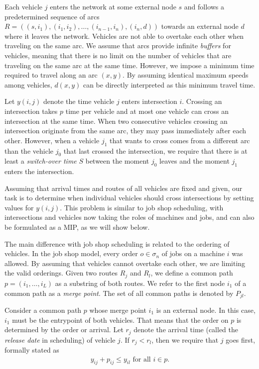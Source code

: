 \documentclass{article}
\theoremstyle{definition}
\theoremstyle{plain}
\begin{document}
Each vehicle $j$ enters the network at some external node $s$ and follows a
predetermined sequence of arcs
$R = ((s,i_{1}), (i_{1},i_{2}), \dots, (i_{n-1},i_{n}), (i_{n},d))$ towards an
external node $d$ where it leaves the network. Vehicles are not able to overtake
each other when traveling on the same arc. We assume that arcs provide
infinite \textit{buffers} for vehicles, meaning that there is no limit on the
number of vehicles that are traveling on the same arc at the same time.
However, we impose a minimum time required to travel along an arc $(x,y)$. By
assuming identical maximum speeds among vehicles, $d(x,y)$ can be directly
interpreted as this minimum travel time.

Let $y(i,j)$ denote the time vehicle $j$ enters intersection $i$. Crossing an
intersection takes $p$ time per vehicle and at most one vehicle can cross an
intersection at the same time. When two consecutive vehicles crossing an
intersection originate from the same arc, they may pass immediately after each
other. However, when a vehicle $j_{1}$ that wants to cross comes from a
different arc than the vehicle $j_{0}$ that last crossed the intersection, we
require that there is at least a \textit{switch-over time} $S$ between the
moment $j_{0}$ leaves and the moment $j_{1}$ enters the intersection.

Assuming that arrival times and routes of all vehicles are fixed and given, our
task is to determine when individual vehicles should cross intersections by
setting values for $y(i,j)$. This problem is similar to job shop scheduling,
with intersections and vehicles now taking the roles of machines and jobs, and
can also be formulated as a MIP, as we will show below.

The main difference with job shop scheduling is related to the ordering of
vehicles. In the job shop model, every order $o \in \sigma_{n}$ of jobs on a
machine $i$ was allowed. By assuming that vehicles cannot overtake each other,
we are limiting the valid orderings.
Given two routes $R_{j}$ and $R_{l}$, we define a common path
$p=(i_{1},\dots,i_{L})$ as a substring of both routes. We refer to the first
node $i_{1}$ of a common path as a \textit{merge point}. The set of all common
paths is denoted by $P_{jl}$.

Consider a common path $p$ whose merge point $i_{1}$ is an external node.
In this case, $i_{1}$ must be the entrypoint of both vehicles.
That means that the order on $p$ is determined by the order or arrival.
Let $r_{j}$ denote the arrival time (called the \textit{release date} in
scheduling) of vehicle $j$.
If $r_{j} < r_{l}$, then we require that $j$ goes first, formally stated as
\begin{align*}
  y_{ij} + p_{ij} \leq y_{il} \text{ for all } i \in p.
\end{align*}
\end{document}

